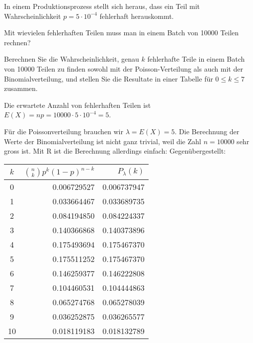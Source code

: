 In einem Produktionsprozess stellt sich heraus, dass ein Teil mit Wahrscheinlichkeit
$p=5\cdot10^{-4}$ fehlerhaft herauskommt.
\begin{teilaufgaben}
\item Mit wievielen fehlerhaften Teilen muss man in einem Batch von 10000 Teilen
rechnen?
\item Berechnen Sie die Wahrscheinlichkeit, genau $k$ fehlerhafte Teile in einem
Batch von 10000 Teilen zu finden sowohl mit der Poisson-Verteilung als auch
mit der Binomialverteilung, und stellen Sie die Resultate in einer Tabelle
für $0\le k\le 7$
zusammen.
\end{teilaufgaben}


\begin{loesung}
\begin{teilaufgaben}
\item Die erwartete Anzahl von fehlerhaften Teilen ist
$E(X)=np=10000\cdot 5\cdot10^{-4}=5$.
\item Für die Poissonverteilung brauchen wir $\lambda=E(X)=5$.
Die Berechnung der Werte der Binomialverteilung ist nicht ganz trivial, weil
die Zahl $n=10000$ sehr gross ist.
Mit R ist die Berechnung allerdings einfach:
Gegenübergestellt:
\begin{center}
\begin{tabular}{c|rr}
$k$&$\binom{n}{k}p^k(1-p)^{n-k}$&$P_\lambda(k)$\\
\hline
 0&0.006729527& 0.006737947\\
 1&0.033664467& 0.033689735\\
 2&0.084194850& 0.084224337\\
 3&0.140366868& 0.140373896\\
 4&0.175493694& 0.175467370\\
 5&0.175511252& 0.175467370\\
 6&0.146259377& 0.146222808\\
 7&0.104460531& 0.104444863\\
 8&0.065274768& 0.065278039\\
 9&0.036252875& 0.036265577\\
10&0.018119183& 0.018132789\\
\hline
\end{tabular}
\end{center}
\end{teilaufgaben}
\end{loesung}

